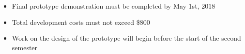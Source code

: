 \begin{itemize}
  \item Final prototype demonstration must be completed by May 1st, 2018
  \item Total development costs must not exceed \$800
  \item Work on the design of the prototype will begin before the start of the second semester
\end{itemize}
